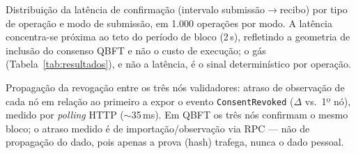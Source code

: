 

\caption{Distribuição da latência de confirmação (intervalo submissão$\rightarrow$recibo)
por tipo de operação e modo de submissão, em 1.000 operações por modo. A latência
concentra-se próxima ao teto do período de bloco (2\,s), refletindo a geometria de
inclusão do consenso QBFT e não o custo de execução; o gás (Tabela~\ref{tab:resultados}),
e não a latência, é o sinal determinístico por operação.}
\label{fig:latencia}

\caption{Propagação da revogação entre os três nós validadores: atraso de observação
de cada nó em relação ao primeiro a expor o evento \texttt{ConsentRevoked}
($\Delta$ vs.\ 1º nó), medido por \emph{polling} HTTP ($\sim$35\,ms). Em QBFT os três
nós confirmam o mesmo bloco; o atraso medido é de importação/observação via RPC --- não
de propagação do dado, pois apenas a prova (hash) trafega, nunca o dado pessoal.}
\label{fig:propagacao}
